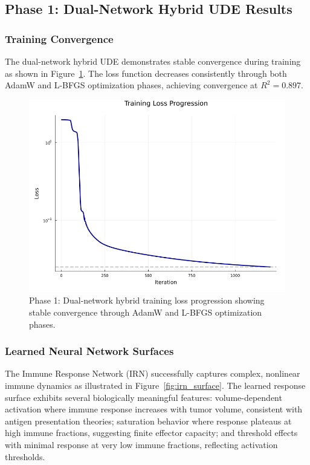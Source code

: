 \documentclass{juliacon}
\begin{document}
\subsection{Phase 1: Dual-Network Hybrid UDE Results}

\subsubsection{Training Convergence}

The dual-network hybrid UDE demonstrates stable convergence during training as shown in Figure~\ref{fig:hybrid_training_loss}. The loss function decreases consistently through both AdamW and L-BFGS optimization phases, achieving convergence at $R^2 = 0.897$.

\begin{figure}[H]\centering
\includegraphics[width=\linewidth]{hybrid_training_loss.png}
\caption{Phase 1: Dual-network hybrid training loss progression showing stable convergence through AdamW and L-BFGS optimization phases.}
\label{fig:hybrid_training_loss}
\end{figure}

\subsubsection{Learned Neural Network Surfaces}

The Immune Response Network (IRN) successfully captures complex, nonlinear immune dynamics as illustrated in Figure~\ref{fig:irn_surface}. The learned response surface exhibits several biologically meaningful features: volume-dependent activation where immune response increases with tumor volume, consistent with antigen presentation theories; saturation behavior where response plateaus at high immune fractions, suggesting finite effector capacity; and threshold effects with minimal response at very low immune fractions, reflecting activation thresholds.
\end{document}
